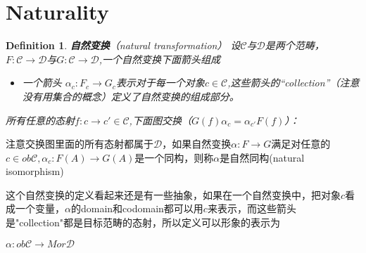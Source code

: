 \documentclass{article}
\newtheorem{definition}[theorem]{Definition}
\begin{document}
\section{Naturality}
\begin{definition}

\textbf{自然变换}（natural transformation）
设$\mathcal{C}$与$\mathcal{D}$是两个范畴，$F \colon \mathcal{C}\rightarrow \mathcal{D}$与$G \colon \mathcal{C} \rightarrow \mathcal{D}$,一个自然变换下面箭头组成
\begin{itemize}
	\item 一个箭头 $\alpha_c \colon F_c \rightarrow G_c$表示对于每一个对象$c \in \mathcal{C}$,这些箭头的“collection”（注意没有用集合的概念）定义了自然变换的组成部分。
\end{itemize}
所有任意的态射$f \colon c \rightarrow c' \in \mathcal{C}$,下面图交换（$G(f)\alpha_{c}=\alpha_{c'}F(f)$）：
\begin{center}
\end{center}

\end{definition}
注意交换图里面的所有态射都属于$\mathcal{D}$，如果自然变换$\alpha \colon F \rightarrow G$满足对任意的$c \in ob\mathcal{C} , \alpha_{c}:F(A) \rightarrow G(A)$是一个同构，则称$\alpha$是$\textbf{自然同构}$(natural isomorphism) 

这个自然变换的定义看起来还是有一些抽象，如果在一个自然变换中，把对象$c$看成一个变量，$\alpha$的domain和codomain都可以用$c$来表示，而这些箭头是"collection"都是目标范畴的态射，所以定义可以形象的表示为
\begin{center}
$\alpha \colon ob\mathcal{C} \rightarrow Mor\mathcal{D}$
\end{center}
\end{document}
